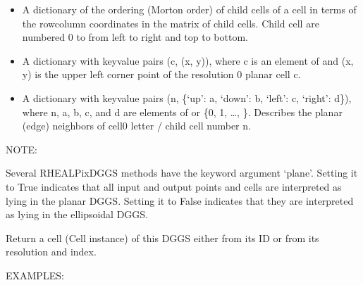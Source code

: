 \documentclass[a4paper,12ptopenany,oneside,english]{sphinxmanual}
\begin{document}
\begin{fulllineitems}
\begin{itemize}
\item {} 
\sphinxAtStartPar
{} \sphinxhyphen{} A dictionary of the ordering (Morton order) of child
cells of a cell in terms of the row\sphinxhyphen{}column coordinates in the matrix
of child cells.  Child cell are numbered 0 to  from
left to right and top to bottom.

\item {} 
\sphinxAtStartPar
{} \sphinxhyphen{} A dictionary with key\sphinxhyphen{}value pairs (c, (x, y)), where
c is an element of  and (x, y) is the upper left corner point
of the resolution 0 planar cell c.

\item {} 
\sphinxAtStartPar
{} \sphinxhyphen{} A dictionary with key\sphinxhyphen{}value pairs
(n, \{‘up’: a, ‘down’: b, ‘left’: c, ‘right’: d\}),
where n, a, b, c, and d are elements of  or
\{0, 1, …, \}.
Describes the planar (edge) neighbors of cell0 letter / child cell number
n.

\end{itemize}

\sphinxAtStartPar
NOTE:

\sphinxAtStartPar
Several RHEALPixDGGS methods have the keyword argument ‘plane’.
Setting it to True indicates that all input and output points and cells are
interpreted as lying in the planar DGGS.
Setting it to False indicates that they are interpreted as lying in
the ellipsoidal DGGS.

\begin{fulllineitems}
\label{\detokenize{dggs:rhealpixdggs.dggs.RHEALPixDGGS.cell}}
\pysigstartsignatures
{}
\pysigstopsignatures
\sphinxAtStartPar
Return a cell (Cell instance) of this DGGS either from its ID or
from its resolution and index.

\sphinxAtStartPar
EXAMPLES:


\end{fulllineitems}
\end{fulllineitems}
\end{document}
